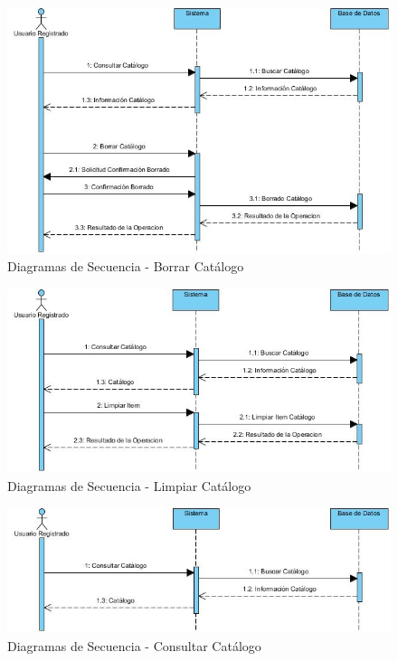 \documentclass[a4paper,11pt]{book}
\begin{document}
\begin{figure}[H] 
\centering 
\includegraphics[scale=0.50]{imagenes/secuencia/Borrar_Catalogo.jpg}
\caption{ Diagramas de Secuencia - Borrar Catálogo\cite{diagrama}  }  
\end{figure}

\begin{figure}[H] 
\centering 
\includegraphics[scale=0.50]{imagenes/secuencia/Limpiar_Items_Catalogo.jpg}
\caption{ Diagramas de Secuencia - Limpiar Catálogo\cite{diagrama}  }  
\end{figure}

\begin{figure}[H] 
\centering 
\includegraphics[scale=0.50]{imagenes/secuencia/Consultar_Catalogo.jpg}
\caption{ Diagramas de Secuencia - Consultar Catálogo\cite{diagrama}  }  
\end{figure}
\end{document}
